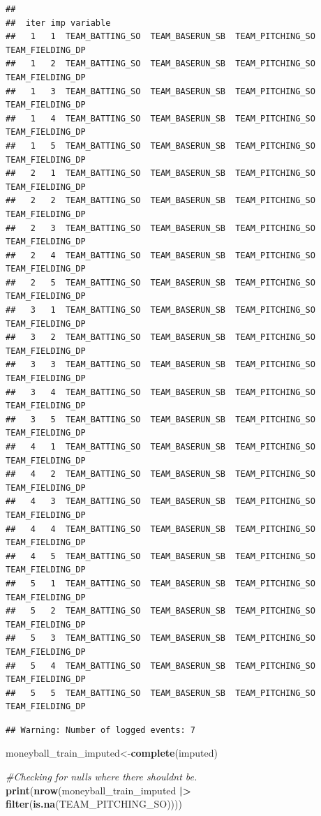 \documentclass[
]{article}
\newenvironment{Shaded}{\begin{snugshade}}{\end{snugshade}}
\newcommand{\CommentTok}[1]{\textcolor[rgb]{0.56,0.35,0.01}{\textit{#1}}}
\newcommand{\FunctionTok}[1]{\textcolor[rgb]{0.13,0.29,0.53}{\textbf{#1}}}
\newcommand{\NormalTok}[1]{#1}
\newcommand{\OtherTok}[1]{\textcolor[rgb]{0.56,0.35,0.01}{#1}}
\newcommand{\SpecialCharTok}[1]{\textcolor[rgb]{0.81,0.36,0.00}{\textbf{#1}}}
\begin{document}
\begin{verbatim}
## 
##  iter imp variable
##   1   1  TEAM_BATTING_SO  TEAM_BASERUN_SB  TEAM_PITCHING_SO  TEAM_FIELDING_DP
##   1   2  TEAM_BATTING_SO  TEAM_BASERUN_SB  TEAM_PITCHING_SO  TEAM_FIELDING_DP
##   1   3  TEAM_BATTING_SO  TEAM_BASERUN_SB  TEAM_PITCHING_SO  TEAM_FIELDING_DP
##   1   4  TEAM_BATTING_SO  TEAM_BASERUN_SB  TEAM_PITCHING_SO  TEAM_FIELDING_DP
##   1   5  TEAM_BATTING_SO  TEAM_BASERUN_SB  TEAM_PITCHING_SO  TEAM_FIELDING_DP
##   2   1  TEAM_BATTING_SO  TEAM_BASERUN_SB  TEAM_PITCHING_SO  TEAM_FIELDING_DP
##   2   2  TEAM_BATTING_SO  TEAM_BASERUN_SB  TEAM_PITCHING_SO  TEAM_FIELDING_DP
##   2   3  TEAM_BATTING_SO  TEAM_BASERUN_SB  TEAM_PITCHING_SO  TEAM_FIELDING_DP
##   2   4  TEAM_BATTING_SO  TEAM_BASERUN_SB  TEAM_PITCHING_SO  TEAM_FIELDING_DP
##   2   5  TEAM_BATTING_SO  TEAM_BASERUN_SB  TEAM_PITCHING_SO  TEAM_FIELDING_DP
##   3   1  TEAM_BATTING_SO  TEAM_BASERUN_SB  TEAM_PITCHING_SO  TEAM_FIELDING_DP
##   3   2  TEAM_BATTING_SO  TEAM_BASERUN_SB  TEAM_PITCHING_SO  TEAM_FIELDING_DP
##   3   3  TEAM_BATTING_SO  TEAM_BASERUN_SB  TEAM_PITCHING_SO  TEAM_FIELDING_DP
##   3   4  TEAM_BATTING_SO  TEAM_BASERUN_SB  TEAM_PITCHING_SO  TEAM_FIELDING_DP
##   3   5  TEAM_BATTING_SO  TEAM_BASERUN_SB  TEAM_PITCHING_SO  TEAM_FIELDING_DP
##   4   1  TEAM_BATTING_SO  TEAM_BASERUN_SB  TEAM_PITCHING_SO  TEAM_FIELDING_DP
##   4   2  TEAM_BATTING_SO  TEAM_BASERUN_SB  TEAM_PITCHING_SO  TEAM_FIELDING_DP
##   4   3  TEAM_BATTING_SO  TEAM_BASERUN_SB  TEAM_PITCHING_SO  TEAM_FIELDING_DP
##   4   4  TEAM_BATTING_SO  TEAM_BASERUN_SB  TEAM_PITCHING_SO  TEAM_FIELDING_DP
##   4   5  TEAM_BATTING_SO  TEAM_BASERUN_SB  TEAM_PITCHING_SO  TEAM_FIELDING_DP
##   5   1  TEAM_BATTING_SO  TEAM_BASERUN_SB  TEAM_PITCHING_SO  TEAM_FIELDING_DP
##   5   2  TEAM_BATTING_SO  TEAM_BASERUN_SB  TEAM_PITCHING_SO  TEAM_FIELDING_DP
##   5   3  TEAM_BATTING_SO  TEAM_BASERUN_SB  TEAM_PITCHING_SO  TEAM_FIELDING_DP
##   5   4  TEAM_BATTING_SO  TEAM_BASERUN_SB  TEAM_PITCHING_SO  TEAM_FIELDING_DP
##   5   5  TEAM_BATTING_SO  TEAM_BASERUN_SB  TEAM_PITCHING_SO  TEAM_FIELDING_DP
\end{verbatim}

\begin{verbatim}
## Warning: Number of logged events: 7
\end{verbatim}

\begin{Shaded}
\begin{Highlighting}[]
\NormalTok{moneyball\_train\_imputed}\OtherTok{\textless{}{-}}\FunctionTok{complete}\NormalTok{(imputed)}

\CommentTok{\#Checking for nulls where there shouldnt be.}
\FunctionTok{print}\NormalTok{(}\FunctionTok{nrow}\NormalTok{(moneyball\_train\_imputed }\SpecialCharTok{|\textgreater{}} \FunctionTok{filter}\NormalTok{(}\FunctionTok{is.na}\NormalTok{(TEAM\_PITCHING\_SO))))}
\end{Highlighting}
\end{Shaded}
\end{document}
